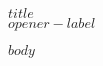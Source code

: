 \documentclass[letterpaper,$if(fontsize)$$fontsize$,$endif$$for(classoption)$$classoption$$sep$,$endfor$]{article}
\newcommand{\titleblock}[2]{
  \begin{flushleft}
    \hrulefill\\
    {\Huge{#1}}\\
    {\LARGE{#2}}\\
    \hrulefill
  \end{flushleft}
}
\begin{document}
\titleblock{$title$}{$opener-label$}

$body$

\end{document}
